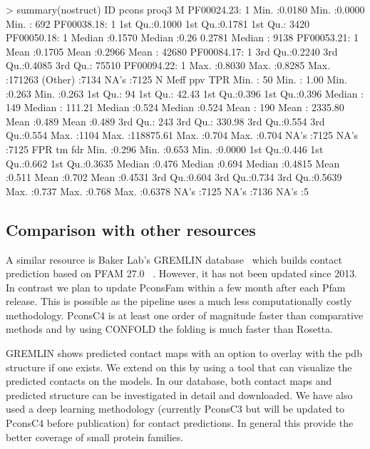 \documentclass[a4,center,fleqn]{NAR}
\begin{document}
> summary(nostruct)
          ID           pcons            proq3              M
 PF00024.23:   1   Min.   :0.0180   Min.   :0.0000   Min.   :   692
 PF00038.18:   1   1st Qu.:0.1000   1st Qu.:0.1781   1st Qu.:  3420
 PF00050.18:   1   Median :0.1570   Median :0.26 0.2781   Median :  9138
 PF00053.21:   1   Mean   :0.1705   Mean   :0.2966   Mean   : 42680
 PF00084.17:   1   3rd Qu.:0.2240   3rd Qu.:0.4085   3rd Qu.: 75510
 PF00094.22:   1   Max.   :0.8030   Max.   :0.8285   Max.   :171263
 (Other)   :7134                                     NA's   :7125
       N             Meff                ppv             TPR
 Min.   :  50   Min.   :     1.00   Min.   :0.263   Min.   :0.263
 1st Qu.:  94   1st Qu.:    42.43   1st Qu.:0.396   1st Qu.:0.396
 Median : 149   Median :   111.21   Median :0.524   Median :0.524
 Mean   : 190   Mean   :  2335.80   Mean   :0.489   Mean   :0.489
 3rd Qu.: 243   3rd Qu.:   330.98   3rd Qu.:0.554   3rd Qu.:0.554
 Max.   :1104   Max.   :118875.61   Max.   :0.704   Max.   :0.704
                                    NA's   :7125    NA's   :7125
      FPR              tm             fdr
 Min.   :0.296   Min.   :0.653   Min.   :0.0000
 1st Qu.:0.446   1st Qu.:0.662   1st Qu.:0.3635
 Median :0.476   Median :0.694   Median :0.4815
 Mean   :0.511   Mean   :0.702   Mean   :0.4531
 3rd Qu.:0.604   3rd Qu.:0.734   3rd Qu.:0.5639
 Max.   :0.737   Max.   :0.768   Max.   :0.6378
 NA's   :7125    NA's   :7136    NA's   :5
\fi

\subsection{Comparison with other resources}

A similar resource is Baker Lab’s GREMLIN database~\cite{Kamisetty2013} which builds contact prediction based on
PFAM 27.0~\cite{Sonnhammer:1997} . However, it has not been updated since
2013. In contrast we plan to update PconsFam within a few month after
each Pfam release. This is possible as the pipeline uses a much less
computationally costly methodology. PconsC4 is at least one order of
magnitude faster than comparative methods and by using CONFOLD the
folding is much faster than Rosetta.


GREMLIN shows predicted contact maps with an option to overlay with
the pdb structure if one exists. We extend on this by using a tool
that can visualize the predicted contacts on the models. In our
database, both contact maps and predicted structure can be
investigated in detail and downloaded.  We have also used a deep
learning methodology (currently PconsC3 but will be updated to PconsC4
before publication) for contact predictions. In general this provide
the better coverage of small protein families.
\end{document}
